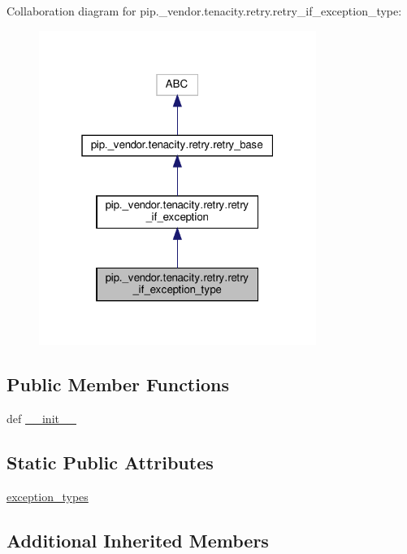 Collaboration diagram for pip.\+\_\+vendor.\+tenacity.\+retry.\+retry\+\_\+if\+\_\+exception\+\_\+type\+:
\nopagebreak
\begin{figure}[H]
\begin{center}
\leavevmode
\includegraphics[width=256pt]{classpip_1_1__vendor_1_1tenacity_1_1retry_1_1retry__if__exception__type__coll__graph}
\end{center}
\end{figure}
\subsection*{Public Member Functions}
\begin{DoxyCompactItemize}
\item 
def \hyperlink{classpip_1_1__vendor_1_1tenacity_1_1retry_1_1retry__if__exception__type_a318b78804361faa7fdfbba10de978adb}{\+\_\+\+\_\+init\+\_\+\+\_\+}
\end{DoxyCompactItemize}
\subsection*{Static Public Attributes}
\begin{DoxyCompactItemize}
\item 
\hyperlink{classpip_1_1__vendor_1_1tenacity_1_1retry_1_1retry__if__exception__type_a21910daf2362b50c21bfa4c9438278d9}{exception\+\_\+types}
\end{DoxyCompactItemize}
\subsection*{Additional Inherited Members}


